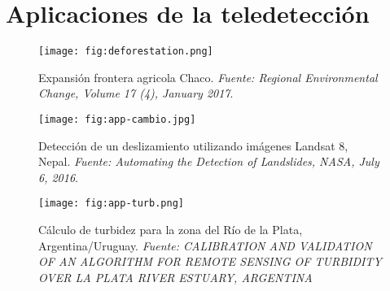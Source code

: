 
\section{Aplicaciones de la teledetección}

\begin{frame}{}
  \begin{figure}
    \centering
    \texttt{[image: fig:deforestation.png]}
    \caption{Expansión frontera agricola Chaco. \emph{Fuente: Regional Environmental Change, Volume 17 (4), January 2017}.}
    \label{}
  \end{figure}
\end{frame}

\begin{frame}{}
  \begin{figure}
    \centering
    \texttt{[image: fig:app-cambio.jpg]}
    \caption{Detección de un deslizamiento utilizando imágenes Landsat 8, Nepal. \emph{Fuente: Automating the Detection of Landslides, NASA, July 6, 2016}.}
    \label{}
  \end{figure}
\end{frame}

\begin{frame}{}
  \begin{figure}
    \centering
    \texttt{[image: fig:app-turb.png]}
    \caption{Cálculo de turbidez para la zona del Río de la Plata, Argentina/Uruguay. \emph{Fuente: CALIBRATION AND VALIDATION OF AN ALGORITHM FOR REMOTE SENSING OF TURBIDITY OVER LA PLATA RIVER ESTUARY, ARGENTINA}}
    \label{}
  \end{figure}
\end{frame}

